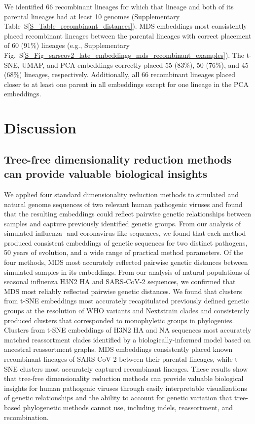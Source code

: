 \documentclass[webpdf,contemporary,large,single]{oup-authoring-template}%
\theoremstyle{thmstyleone}%
\theoremstyle{thmstyletwo}%
\theoremstyle{thmstylethree}%
\begin{document}
We identified 66 recombinant lineages for which that lineage and both of its parental lineages had at least 10 genomes (Supplementary Table~S\ref{S_Table_recombinant_distances}).
MDS embeddings most consistently placed recombinant lineages between the parental lineages with correct placement of 60 (91\%) lineages (e.g., Supplementary Fig.~S\ref{S_Fig_sarscov2_late_embeddings_mds_recombinant_examples}).
The t-SNE, UMAP, and PCA embeddings correctly placed 55 (83\%), 50 (76\%), and 45 (68\%) lineages, respectively.
Additionally, all 66 recombinant lineages placed closer to at least one parent in all embeddings except for one lineage in the PCA embeddings.

\section{Discussion}

\subsection{Tree-free dimensionality reduction methods can provide valuable biological insights}

We applied four standard dimensionality reduction methods to simulated and natural genome sequences of two relevant human pathogenic viruses and found that the resulting embeddings could reflect pairwise genetic relationships between samples and capture previously identified genetic groups.
From our analysis of simulated influenza- and coronavirus-like sequences, we found that each method produced consistent embeddings of genetic sequences for two distinct pathogens, 50 years of evolution, and a wide range of practical method parameters.
Of the four methods, MDS most accurately reflected pairwise genetic distances between simulated samples in its embeddings.
From our analysis of natural populations of seasonal influenza H3N2 HA and SARS-CoV-2 sequences, we confirmed that MDS most reliably reflected pairwise genetic distances.
We found that clusters from t-SNE embeddings most accurately recapitulated previously defined genetic groups at the resolution of WHO variants and Nextstrain clades and consistently produced clusters that corresponded to monophyletic groups in phylogenies.
Clusters from t-SNE embeddings of H3N2 HA and NA sequences most accurately matched reassortment clades identified by a biologically-informed model based on ancestral reassortment graphs.
MDS embeddings consistently placed known recombinant lineages of SARS-CoV-2 between their parental lineages, while t-SNE clusters most accurately captured recombinant lineages.
These results show that tree-free dimensionality reduction methods can provide valuable biological insights for human pathogenic viruses through easily interpretable visualizations of genetic relationships and the ability to account for genetic variation that tree-based phylogenetic methods cannot use, including indels, reassortment, and recombination.
\end{document}
